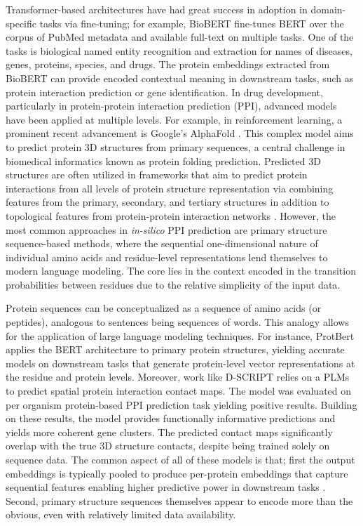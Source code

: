 \documentclass[utf8]{FrontiersinHarvard}
\begin{document}
	Transformer-based architectures have had great success in adoption in domain-specific tasks via fine-tuning; for example, BioBERT \cite{lee_biobertpretrainedbiomedical_2020} fine-tunes BERT over the corpus of PubMed metadata and available full-text on multiple tasks. One of the tasks is biological named entity recognition and extraction for names of diseases, genes, proteins, species, and drugs. The protein embeddings extracted from BioBERT can provide encoded contextual meaning in downstream tasks, such as protein interaction prediction or gene identification. In drug development, particularly in protein-protein interaction prediction (PPI), advanced models have been applied at multiple levels. For example, in reinforcement learning, a prominent recent advancement is Google’s AlphaFold \cite{jumper_highlyaccurateprotein_2021}. This complex model aims to predict protein 3D structures from primary sequences, a central challenge in biomedical informatics known as protein folding prediction. Predicted 3D structures are often utilized in frameworks that aim to predict protein interactions from all levels of protein structure representation via combining features from the primary, secondary, and tertiary structures in addition to topological features from protein-protein interaction networks \cite{zhou_graphneuralnetwork_2022} \cite{jha_predictionproteinprotein_2022}. However, the most common approaches in \textit{in-silico} PPI prediction are primary structure sequence-based methods, where the sequential one-dimensional nature of individual amino acids and residue-level representations lend themselves to modern language modeling. The core lies in the context encoded in the transition probabilities between residues due to the relative simplicity of the input data.
	
	Protein sequences can be conceptualized as a sequence of amino acids (or peptides), analogous to sentences being sequences of words. This analogy allows for the application of large language modeling techniques. For instance, ProtBert \cite{elnaggar_prottransunderstandinglanguage_2022} applies the BERT architecture \cite{devlin_bertpretrainingdeep_2019} to primary protein structures, yielding accurate models on downstream tasks that generate protein-level vector representations at the residue and protein levels. Moreover, work like \cite{sledzieski_dscripttranslatesgenome_2021} D-SCRIPT relies on a PLMs to predict spatial protein interaction contact maps. The model was evaluated on per organism protein-based PPI prediction task yielding positive results. Building on these results, the model provides functionally informative predictions and yields more coherent gene clusters. The predicted contact maps significantly overlap with the true 3D structure contacts, despite being trained solely on sequence data. The common aspect of all of these models is that; first the output embeddings is typically pooled to produce per-protein embeddings that capture sequential features enabling higher predictive power in downstream tasks \cite{elnaggar_prottransunderstandinglanguage_2022}. Second, primary structure sequences themselves appear to encode more than the obvious, even with relatively limited data availability.
	
\end{document}
